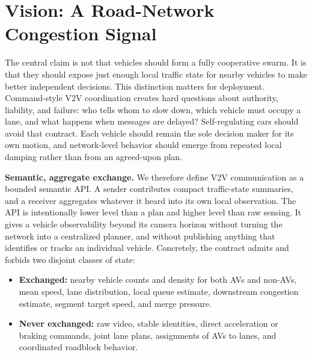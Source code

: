 \section{Vision: A Road-Network Congestion Signal}
\label{sec:vision}

The central claim is not that vehicles should form a fully cooperative swarm. It is that they should expose just enough local traffic state for nearby vehicles to make better independent decisions. This distinction matters for deployment. Command-style V2V coordination creates hard questions about authority, liability, and failure: who tells whom to slow down, which vehicle must occupy a lane, and what happens when messages are delayed? Self-regulating cars should avoid that contract. Each vehicle should remain the sole decision maker for its own motion, and network-level behavior should emerge from repeated local damping rather than from an agreed-upon plan.

\noindent\textbf{Semantic, aggregate exchange.}
We therefore define V2V communication as a bounded semantic API. A sender contributes compact traffic-state summaries, and a receiver aggregates whatever it heard into its own local observation. The API is intentionally lower level than a plan and higher level than raw sensing. It gives a vehicle observability beyond its camera horizon without turning the network into a centralized planner, and without publishing anything that identifies or tracks an individual vehicle. Concretely, the contract admits and forbids two disjoint classes of state:
\begin{itemize}[nosep,leftmargin=1.2em]
\item \textbf{Exchanged:} nearby vehicle counts and density for both AVs and non-AVs, mean speed, lane distribution, local queue estimate, downstream congestion estimate, segment target speed, and merge pressure.
\item \textbf{Never exchanged:} raw video, stable identities, direct acceleration or braking commands, joint lane plans, assignments of AVs to lanes, and coordinated roadblock behavior.
\end{itemize}

